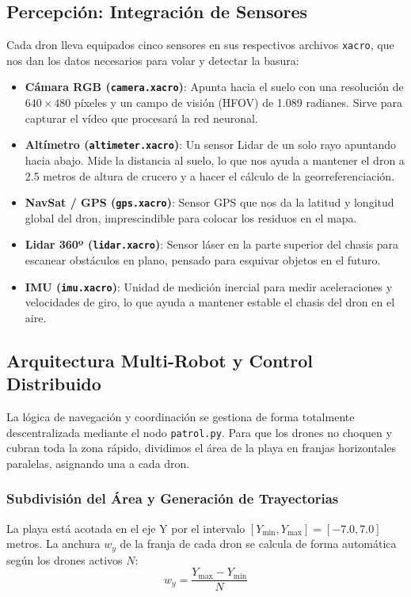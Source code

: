 \documentclass[11pt,a4paper]{article}
\begin{document}
\subsection{Percepción: Integración de Sensores}
Cada dron lleva equipados cinco sensores en sus respectivos archivos \texttt{xacro}, que nos dan los datos necesarios para volar y detectar la basura:

\begin{itemize}
    \item \textbf{Cámara RGB (\texttt{camera.xacro})}: Apunta hacia el suelo con una resolución de $640 \times 480$ píxeles y un campo de visión (HFOV) de 1.089 radianes. Sirve para capturar el vídeo que procesará la red neuronal.
    \item \textbf{Altímetro (\texttt{altimeter.xacro})}: Un sensor Lidar de un solo rayo apuntando hacia abajo. Mide la distancia al suelo, lo que nos ayuda a mantener el dron a 2.5 metros de altura de crucero y a hacer el cálculo de la georreferenciación.
    \item \textbf{NavSat / GPS (\texttt{gps.xacro})}: Sensor GPS que nos da la latitud y longitud global del dron, imprescindible para colocar los residuos en el mapa.
    \item \textbf{Lidar 360º (\texttt{lidar.xacro})}: Sensor láser en la parte superior del chasis para escanear obstáculos en plano, pensado para esquivar objetos en el futuro.
    \item \textbf{IMU (\texttt{imu.xacro})}: Unidad de medición inercial para medir aceleraciones y velocidades de giro, lo que ayuda a mantener estable el chasis del dron en el aire.
\end{itemize}

\subsection{Arquitectura Multi-Robot y Control Distribuido}
La lógica de navegación y coordinación se gestiona de forma totalmente descentralizada mediante el nodo \texttt{patrol.py}. Para que los drones no choquen y cubran toda la zona rápido, dividimos el área de la playa en franjas horizontales paralelas, asignando una a cada dron.

\subsubsection{Subdivisión del Área y Generación de Trayectorias}
La playa está acotada en el eje Y por el intervalo $[Y_{\text{min}}, Y_{\text{max}}] = [-7.0, 7.0]$ metros. La anchura $w_y$ de la franja de cada dron se calcula de forma automática según los drones activos $N$:
\begin{equation}
w_y = \frac{Y_{\text{max}} - Y_{\text{min}}}{N}
\end{equation}
\end{document}
